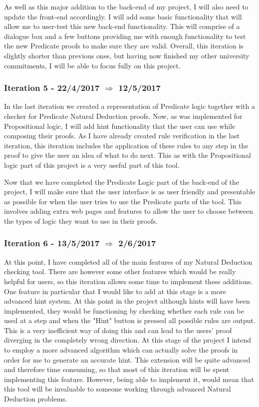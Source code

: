 As well as this major addition to the back-end of my project, I will also need to update the front-end accordingly. I will add some basic functionality that will allow me to user-test this new back-end functionality. This will comprise of a dialogue box and a few buttons providing me  with enough functionality to test the new Predicate proofs to make sure they are valid. Overall, this iteration is slightly shorter than previous ones, but having now finished my other university commitments, I will be able to focus fully on this project. 

\subsubsection{Iteration 5 - 22/4/2017 $\Rightarrow$ 12/5/2017}

In the last iteration we created a representation of Predicate logic together with a checker for Predicate Natural Deduction proofs. Now, as was implemented for Propositional logic, I will add hint functionality that the user can use while composing their proofs. As I have already created rule verification in the last iteration, this iteration includes the application of these rules to any step in the proof to give the user an idea of what to do next. This as with the Propositional logic part of this project is a very useful part of this tool. 

Now that we have completed the Predicate Logic part of the back-end of the project, I will make sure that the user interface is as user friendly and presentable as possible for when the user tries to use the Predicate parts of the tool. This involves adding extra web pages and features to allow the user to choose between the types of logic they want to use in their proofs.

\subsubsection{Iteration 6 - 13/5/2017 $\Rightarrow$ 2/6/2017}

At this point, I have completed all of the main features of my Natural Deduction checking tool. There are however some other features which would be really helpful for users, so this iteration allows some time to implement these additions. One feature in particular that I would like to add at this stage is a more advanced hint system. At this point in the project although hints will have been implemented, they would be functioning by checking whether each rule can be used at a step and when the "Hint" button is pressed all possible rules are output. This is a very inefficient way of doing this and can lead to the users' proof diverging in the completely wrong direction. At this stage of the project I intend to employ a more advanced algorithm which can actually solve the proofs in order for me to generate an accurate hint. This extension will be quite advanced and therefore time consuming, so that most of this iteration will be spent implementing this feature. However, being able to implement it, would mean that this tool will be invaluable to someone working through advanced Natural Deduction problems.

